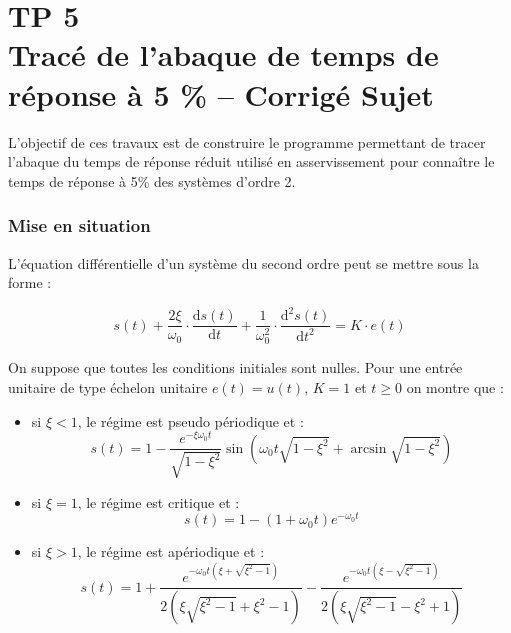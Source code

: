 \chapter*{TP 5 \\ 
Tracé de l'abaque de temps de réponse à 5 \% -- \ifprof Corrigé \else Sujet \fi}

\iflivret {} \else
\ifprof  {} \else \fi
\fi

\setcounter{question}{0}


\begin{obj}
L'objectif de ces travaux est de construire le programme permettant de tracer l'abaque du temps de réponse réduit utilisé en asservissement pour connaître le temps de réponse à 5\% des systèmes d'ordre 2. 
\end{obj}

\subsection*{Mise en situation}
\ifprof
\else

L'équation différentielle d'un système du second ordre peut se mettre sous la forme :

$$
s(t)
+\dfrac{2\xi}{\omega_0}\cdot \dfrac{\text{d}s(t)}{\text{d}t}
+\dfrac{1}{\omega_0^2}\cdot \dfrac{\text{d}^2s(t)}{\text{d}t^2}
= K\cdot e(t)
$$



On suppose que toutes les conditions initiales sont nulles. Pour une entrée unitaire de type échelon unitaire $e(t)=u(t)$, $K=1$ et $t\geq0$ on montre que : 
\begin{itemize}
\item si $\xi <1$, le régime est pseudo périodique et :
$$
s(t)=1-\dfrac{e^{-\xi\omega_0 t}}{\sqrt{1-\xi^2}}\sin\left(  \omega_0 t\sqrt{1-\xi^2}+\arcsin \sqrt{1-\xi^2} \right)
$$
\item si $\xi=1$, le régime est critique et : 
$$
s(t)=1-\left(1+\omega_0 t \right)e^{-\omega_0 t} 
$$
\item si $\xi>1$, le régime est apériodique et : 
$$
s(t)=1
+\dfrac{e^{- \omega_0 t\left( \xi + \sqrt{\xi^2-1}\right)}}{2\left(\xi\sqrt{\xi^2-1}+\xi^2-1 \right)}
-\dfrac{e^{- \omega_0 t \left( \xi - \sqrt{\xi^2-1}\right)}}{2\left(\xi\sqrt{\xi^2-1}-\xi^2+1 \right)}
$$
\end{itemize} 


